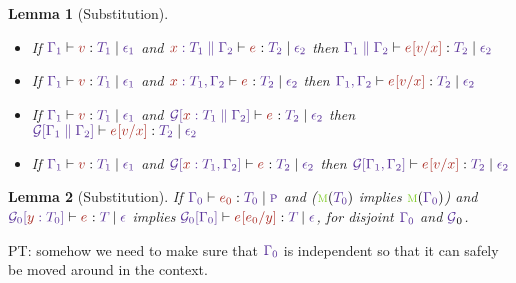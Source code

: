 \documentclass{article}
\newtheorem{lemma}{Lemma}
\begin{document}
\begin{lemma}[Substitution]\
  \begin{itemize}
    \item If $\HasType {\Ctx[1]} {\V} {\T[1]} {\Eff[1]}$ and
    $\HasType {\CtxExtUnord{\CtxVar x{\T[1]}}{\Ctx[2]}} {\E} {\T[2]} {\Eff[2]}$
    then 
    $\HasType {\CtxExtUnord{\Ctx[1]}{\Ctx[2]}} {\Subs\E\V x} {\T[2]} {\Eff[2]}$
    \item If $\HasType {\Ctx[1]} {\V} {\T[1]} {\Eff[1]}$ and
    $\HasType {\CtxExt{\CtxVar x{\T[1]}}{\Ctx[2]}} {\E} {\T[2]} {\Eff[2]}$
    then 
    $\HasType {\CtxExt{\Ctx[1]}{\Ctx[2]}} {\Subs\E\V x} {\T[2]} {\Eff[2]}$
    \item If $\HasType {\Ctx[1]} {\V} {\T[1]} {\Eff[1]}$
    and
    $\HasType
    {\CtxPattern{\CtxExtUnord{\CtxVar x{\T[1]}}{\Ctx[2]}}}
    {\E}
    {\T[2]}
    {\Eff[2]}$ then 
    $\HasType {\CtxPattern{\CtxExtUnord{\Ctx[1]}{\Ctx[2]}}} {\Subs\E\V x} {\T[2]} {\Eff[2]}$
  \item If $\HasType {\Ctx[1]} {\V} {\T[1]} {\Eff[1]}$
    and
    $\HasType
    {\CtxPattern{\CtxExt{\CtxVar x{\T[1]}}{\Ctx[2]}}}
    {\E}
    {\T[2]}
    {\Eff[2]}$ then 
    $\HasType {\CtxPattern{\CtxExt{\Ctx[1]}{\Ctx[2]}}} {\Subs\E\V x} {\T[2]} {\Eff[2]}$
  \end{itemize}
\end{lemma}
\begin{lemma}[Substitution]
  \label{lem:substitution}
  If 
  $\HasType {\Ctx[0]} {\E[0]} {\T[0]} {\EffPure}$
  and
  ($\MobMobile (\T[0])$ implies $\MobMobile (\Ctx[0])$)
  and
  $\HasType
    {\CtxPattern[0]{\CtxVar y{\T[0]}}}
    {\E}
    {\T}
    {\Eff}$
    implies
    $\HasType {\CtxPattern[0]{{\Ctx[0]}}} {\Subs\E{\E[0]} y} {\T}
    {\Eff}$, for disjoint $\Ctx[0]$ and $\CtxPatternRaw_0$.
  \end{lemma}
  PT: somehow we need to make sure that $\Ctx[0]$ is independent so
  that it can safely be moved around in the context.
\end{document}
